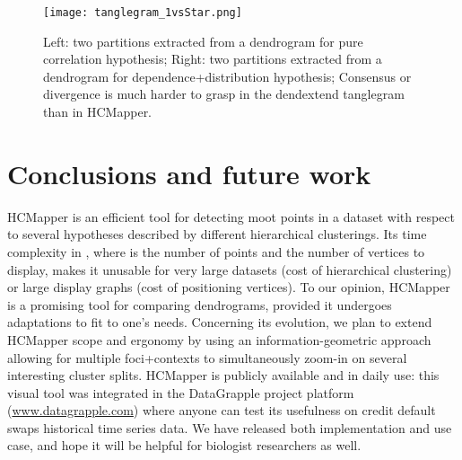 \documentclass[10pt,conference,a4paper]{IEEEtran}
\begin{document}
\begin{figure}[htb]
	\texttt{[image: tanglegram\_1vsStar.png]}
      \caption{\label{fig:Tanglegram1Star}
            Left: two partitions extracted from a dendrogram for pure correlation hypothesis; Right: two partitions extracted from a dendrogram for dependence+distribution hypothesis; Consensus or divergence is much harder to grasp in the dendextend tanglegram \cite{galili2015dendextend} than in HCMapper.}
\end{figure}




\section{Conclusions and future work}


HCMapper is an efficient tool for detecting moot points in a dataset with respect to several hypotheses described by different hierarchical clusterings. Its time complexity in , where  is the number of points and  the number of vertices to display,  makes it unusable for very large datasets (cost of hierarchical clustering) or large display graphs (cost of positioning vertices).
To our opinion, HCMapper is a promising tool for comparing dendrograms, provided it undergoes adaptations to fit to one's needs. Concerning its evolution, we plan to extend HCMapper scope and ergonomy by using an information-geometric approach \cite{Nock:2013:ILM:2542355.2542378} allowing for multiple foci+contexts to simultaneously zoom-in on several interesting cluster splits. 
HCMapper is publicly available and in daily use: this visual tool was  
integrated in the DataGrapple project platform (\url{www.datagrapple.com}) where anyone can test its usefulness on credit default swaps historical time series data.
We have released both implementation and use case, and hope it will be helpful for biologist researchers as well.









\end{document}
